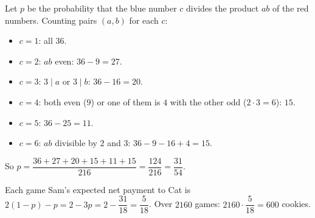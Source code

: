 Let $p$ be the probability that the blue number $c$ divides the product $ab$ of the red numbers. Counting pairs $(a,b)$ for each $c$:
\begin{itemize}
\item $c=1$: all $36$.
\item $c=2$: $ab$ even: $36-9=27$.
\item $c=3$: $3\mid a$ or $3\mid b$: $36-16=20$.
\item $c=4$: both even ($9$) or one of them is $4$ with the other odd ($2\cdot3=6$): $15$.
\item $c=5$: $36-25=11$.
\item $c=6$: $ab$ divisible by $2$ and $3$: $36-9-16+4=15$.
\end{itemize}
So $p=\dfrac{36+27+20+15+11+15}{216}=\dfrac{124}{216}=\dfrac{31}{54}$.

Each game Sam's expected net payment to Cat is $2(1-p)-p=2-3p=2-\dfrac{31}{18}=\dfrac5{18}$. Over $2160$ games: $2160\cdot\dfrac5{18}=\boxed{600}$ cookies.
